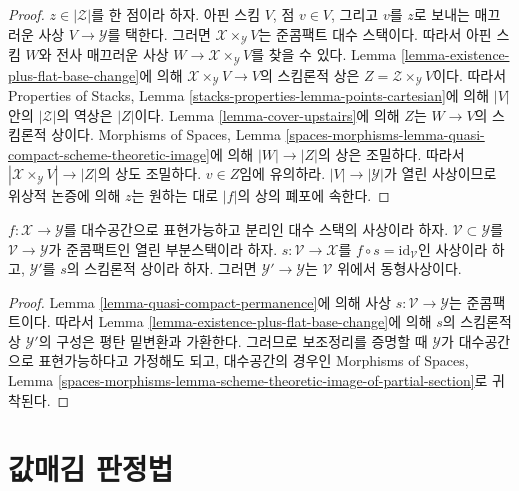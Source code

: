 \begin{proof}
$z \in |\mathcal{Z}|$를 한 점이라 하자. 아핀 스킴 $V$, 점 $v \in V$,
그리고 $v$를 $z$로 보내는 매끄러운 사상 $V \to \mathcal{Y}$를
택한다. 그러면 $\mathcal{X} \times_\mathcal{Y} V$는 준콤팩트 대수
스택이다. 따라서 아핀 스킴 $W$와 전사 매끄러운 사상
$W \to \mathcal{X} \times_\mathcal{Y} V$를 찾을 수 있다. Lemma
\ref{lemma-existence-plus-flat-base-change}에 의해
$\mathcal{X} \times_\mathcal{Y} V \to V$의 스킴론적 상은
$Z = \mathcal{Z} \times_\mathcal{Y} V$이다. 따라서 Properties of Stacks,
Lemma \ref{stacks-properties-lemma-points-cartesian}에 의해
$|V|$ 안의 $|\mathcal{Z}|$의 역상은 $|Z|$이다. Lemma
\ref{lemma-cover-upstairs}에 의해 $Z$는 $W \to V$의 스킴론적 상이다.
Morphisms of Spaces, Lemma
\ref{spaces-morphisms-lemma-quasi-compact-scheme-theoretic-image}에 의해
$|W| \to |Z|$의 상은 조밀하다. 따라서
$|\mathcal{X} \times_\mathcal{Y} V| \to |Z|$의 상도 조밀하다.
$v \in Z$임에 유의하라. $|V| \to |\mathcal{Y}|$가 열린 사상이므로
위상적 논증에 의해 $z$는 원하는 대로 $|f|$의 상의 폐포에 속한다.
\end{proof}

\begin{lemma}
\label{lemma-scheme-theoretic-image-of-partial-section}
$f : \mathcal{X} \to \mathcal{Y}$를 대수공간으로 표현가능하고 분리인
대수 스택의 사상이라 하자. $\mathcal{V} \subset \mathcal{Y}$를
$\mathcal{V} \to \mathcal{Y}$가 준콤팩트인 열린 부분스택이라 하자.
$s : \mathcal{V} \to \mathcal{X}$를
$f \circ s = \text{id}_\mathcal{V}$인 사상이라 하고, $\mathcal{Y}'$를
$s$의 스킴론적 상이라 하자. 그러면
$\mathcal{Y}' \to \mathcal{Y}$는 $\mathcal{V}$ 위에서 동형사상이다.
\end{lemma}

\begin{proof}
Lemma \ref{lemma-quasi-compact-permanence}에 의해 사상
$s : \mathcal{V} \to \mathcal{Y}$는 준콤팩트이다. 따라서 Lemma
\ref{lemma-existence-plus-flat-base-change}에 의해 $s$의 스킴론적 상
$\mathcal{Y}'$의 구성은 평탄 밑변환과 가환한다. 그러므로 보조정리를
증명할 때 $\mathcal{Y}$가 대수공간으로 표현가능하다고 가정해도 되고,
대수공간의 경우인 Morphisms of Spaces, Lemma
\ref{spaces-morphisms-lemma-scheme-theoretic-image-of-partial-section}로
귀착된다.
\end{proof}









\section{값매김 판정법}
\label{section-valuative}

